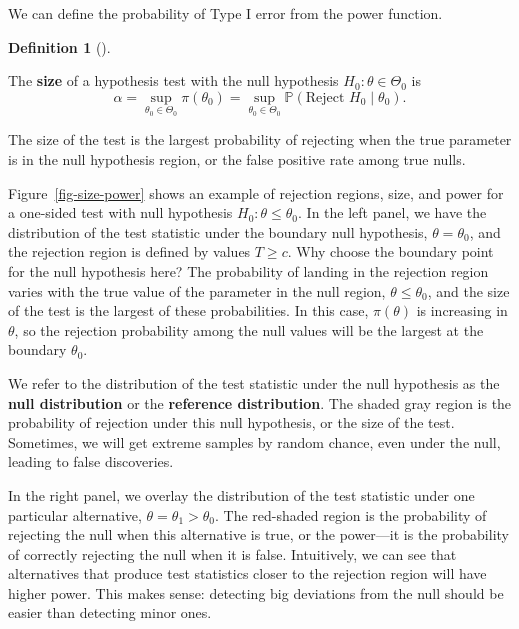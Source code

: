 \documentclass[
  13pt,
  letterpaper,
  DIV=11,
  numbers=noendperiod]{scrreprt}
\renewcommand{\P}{\mathbb{P}}
\theoremstyle{plain}
\theoremstyle{plain}
\theoremstyle{definition}
\newtheorem{definition}{Definition}[chapter]
\theoremstyle{definition}
\theoremstyle{remark}
\begin{document}
We can define the probability of Type I error from the power function.

\begin{definition}[]\protect\hypertarget{def-size}{}\label{def-size}

The \textbf{size} of a hypothesis test with the null hypothesis
\(H_0: \theta \in \Theta_0\) is \[ 
\alpha = \sup_{\theta_0 \in \Theta_0} \pi(\theta_0) = \sup_{\theta_0 \in \Theta_0} \P\left( \text{Reject } H_0 \mid \theta_0 \right).
\]

\end{definition}

The size of the test is the largest probability of rejecting when the
true parameter is in the null hypothesis region, or the false positive
rate among true nulls.

Figure~\ref{fig-size-power} shows an example of rejection regions, size,
and power for a one-sided test with null hypothesis
\(H_0: \theta \leq \theta_0\). In the left panel, we have the
distribution of the test statistic under the boundary null hypothesis,
\(\theta = \theta_0\), and the rejection region is defined by values
\(T \geq c\). Why choose the boundary point for the null hypothesis
here? The probability of landing in the rejection region varies with the
true value of the parameter in the null region,
\(\theta \leq \theta_0\), and the size of the test is the largest of
these probabilities. In this case, \(\pi(\theta)\) is increasing in
\(\theta\), so the rejection probability among the null values will be
the largest at the boundary \(\theta_0\).

We refer to the distribution of the test statistic under the null
hypothesis as the \textbf{null distribution} or the \textbf{reference
distribution}. The shaded gray region is the probability of rejection
under this null hypothesis, or the size of the test. Sometimes, we will
get extreme samples by random chance, even under the null, leading to
false discoveries.

In the right panel, we overlay the distribution of the test statistic
under one particular alternative, \(\theta = \theta_1 > \theta_0\). The
red-shaded region is the probability of rejecting the null when this
alternative is true, or the power---it is the probability of correctly
rejecting the null when it is false. Intuitively, we can see that
alternatives that produce test statistics closer to the rejection region
will have higher power. This makes sense: detecting big deviations from
the null should be easier than detecting minor ones.
\end{document}
